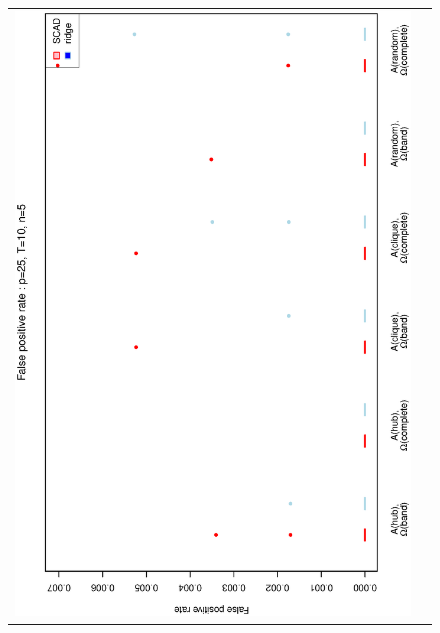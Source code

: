 \begin{figure}[h!]
\centering
\begin{tabular}{cc}
\includegraphics[scale=0.45,angle=270]{ROCfpr25T10N5_5.eps}
\\

\end{tabular}
\end{figure}
